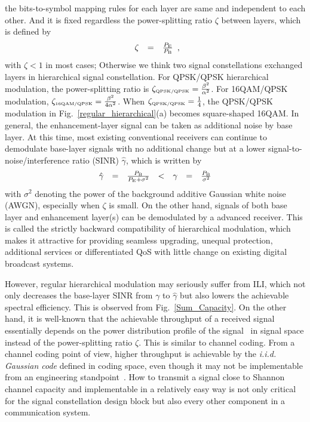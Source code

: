 \documentclass[10pt,fleqn, twocolumn]{IEEEtran}
\begin{document}
the bits-to-symbol mapping rules for each layer are same and
independent to each other. And it is fixed regardless the
power-splitting ratio $\zeta$ between layers, which is defined by
\begin{equation}
\begin{array}{rcl}
\zeta& = & \frac{P_{\rm E}}{P_{\rm B}}
\end{array},\label{power_ratio}
\end{equation}
\noindent with $\zeta < 1$ in most cases; Otherwise we think two
signal constellations exchanged layers in hierarchical signal
constellation. For QPSK/QPSK hierarchical modulation, the
power-splitting ratio is $\zeta_{\mbox{\tiny QPSK/QPSK}}=
\frac{\beta^{2}}{\alpha^2}$. For 16QAM/QPSK modulation,
$\zeta_{\mbox{\tiny 16QAM/QPSK}}= \frac{\beta^{2}}{4\alpha^2}$.
When $\zeta_{\mbox{\tiny QPSK/QPSK}}=\frac{1}{4}$, the QPSK/QPSK
modulation in Fig.~\ref{regular_hierarchical}(a) becomes
square-shaped 16QAM. In general, the enhancement-layer signal can
be taken as additional noise by base layer. At this time, most
existing conventional receivers can continue to demodulate
base-layer signals with no additional change but at a lower
signal-to-noise/interference ratio (SINR) $\hat{\gamma}$, which is
written by
\begin{equation}
\begin{array}{rcccccl}
\hat{\gamma}& = & \frac{P_{\rm B}}{P_{\rm
E}+\sigma^2}&<&\gamma&=&\frac{P_{\rm B}}{\sigma^2}
\end{array}\label{SINR}
\end{equation}
\noindent with $\sigma^2$ denoting the power of the background
additive Gaussian white noise (AWGN),  especially when $\zeta$ is
small. On the other hand, signals of both base layer and
enhancement layer(s) can be demodulated by a advanced receiver.
This is called the strictly backward compatibility of hierarchical
modulation, which makes it attractive for providing seamless
upgrading, unequal protection, additional services or
differentiated QoS with little change on existing digital
broadcast systems.

However, regular hierarchical modulation may seriously suffer from
ILI, which not only decreases the base-layer SINR from ${\gamma}$
to $\hat{\gamma}$ but also lowers the achievable spectral
efficiency. This is observed from Fig.~\ref{Sum_Capacity}. On the
other hand, it is well-known that the achievable throughput of a
received signal essentially depends on the power distribution
profile of the signal~\cite{Unge82} in signal space instead of the
power-splitting ratio $\zeta$. This is similar to channel coding.
From a channel coding point of view, higher throughput is
achievable by the {\em i.i.d. Gaussian code} defined in coding
space, even though it may not be implementable from an engineering
standpoint~\cite{Cover72}. How to transmit a signal close to
Shannon channel capacity and implementable in a relatively easy
way is not only critical for the signal constellation design block
but also every other component in a communication system.
\end{document}
